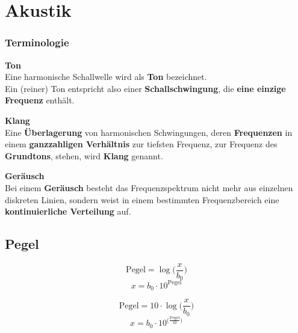 \section{Akustik}

\subsubsection{Terminologie}

\textbf{Ton}\\
Eine harmonische Schallwelle wird als \textbf{Ton} bezeichnet. \\
Ein (reiner) Ton entspricht also einer \textbf{Schallschwingung}, die \textbf{eine
einzige Frequenz} enthält. \\
\vspace{0.2cm}

\textbf{Klang} \\
Eine \textbf{Überlagerung} von harmonischen Schwingungen, deren
\textbf{Frequenzen} in einem \textbf{ganzzahligen Verhältnis} zur tiefsten
Frequenz, zur Frequenz des \textbf{Grundtons}, stehen, wird \textbf{Klang}
genannt. \\
\vspace{0.2cm}

\textbf{Geräusch} \\
Bei einem \textbf{Geräusch} besteht das Frequenzspektrum nicht mehr
aus einzelnen diskreten Linien, sondern weist in einem
bestimmten Frequenzbereich eine  \textbf{kontinuierliche Verteilung} auf. \\




\subsection{Pegel}\label{Pegel}

\begin{minipage}{0.48\linewidth}
$$ \boxed{ \text{Pegel} = \log \Big( \frac{x}{b_0} \Big) } $$
$$ \boxed{ x = b_0 \cdot 10^{\text{Pegel} } } $$ 

\end{minipage}
\hfill
\begin{minipage}{0.48\linewidth}
$$ \boxed{ \text{Pegel} = 10 \cdot \log \Big( \frac{x}{b_0} \Big) } $$ 
$$ \boxed{ x = b_0 \cdot 10^{\Big( \frac{\text{Pegel}}{10} \Big) } } $$ \\
\end{minipage}


